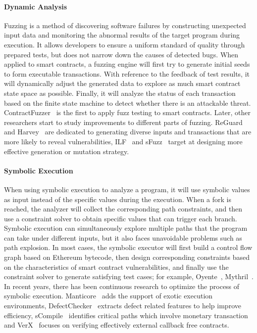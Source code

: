 \paragraph{Dynamic Analysis}
Fuzzing is a method of discovering software failures by constructing unexpected input data and monitoring the abnormal results of the target program during execution.
It allows developers to ensure a uniform standard of quality through prepared tests, but does not narrow down the causes of detected bugs.
When applied to smart contracts, a fuzzing engine will first try to generate initial seeds to form executable transactions.
With reference to the feedback of test results, it will dynamically adjust the generated data to explore as much smart contract state space as possible.
Finally, it will analyze the status of each transaction based on the finite state machine to detect whether there is an attackable threat.
ContractFuzzer~\cite{contractfuzzer} is the first to apply fuzz testing to smart contracts. Later, other researchers start to study improvements to different parts of fuzzing.
ReGuard~\cite{liu2018reguard} and Harvey~\cite{wustholz2020harvey} are dedicated to generating diverse inputs and transactions that are more likely to reveal vulnerabilities, ILF~\cite{he2019learning} and sFuzz~\cite{nguyen2020sfuzz} target at designing more effective generation or mutation strategy.

\paragraph{Symbolic Execution}
When using symbolic execution to analyze a program, it will use symbolic values as input instead of the specific values during the execution.
When a fork is reached, the analyzer will collect the corresponding path constraints, and then use a constraint solver to obtain specific values that can trigger each branch.
Symbolic execution can simultaneously explore multiple paths that the program can take under different inputs, but it also faces unavoidable problems such as path explosion.
In most cases, the symbolic executor will first build a control flow graph based on Ethereum bytecode, then design corresponding constraints based on the characteristics of smart contract vulnerabilities, and finally use the constraint solver to generate satisfying test cases; for example, Oyente~\cite{oyente}, Mythril~\cite{mythril}.
In recent years, there has been continuous research to optimize the process of symbolic execution.
Manticore~\cite{mossberg2019manticore} adds the support of exotic execution environments, DefectChecker~\cite{chen2021defectchecker} extracts defect related features to help improve efficiency, sCompile~\cite{chang2019scompile} identifies critical paths which involve monetary transaction and VerX~\cite{permenev2020verx} focuses on verifying effectively external callback free contracts.

